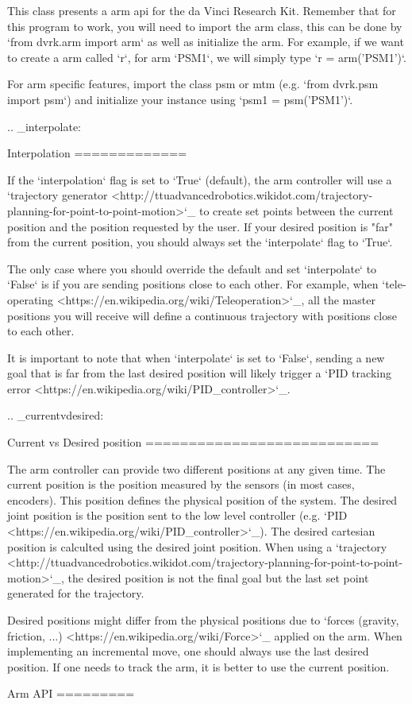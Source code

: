 \begin{DoxyVerb}This class presents a arm api for the da Vinci Research Kit.
Remember that for this program to work, you will need to import the
arm class, this can be done by `from dvrk.arm import arm` as well as
initialize the arm. For example, if we want to create a arm called
`r`, for arm `PSM1`, we will simply type `r = arm('PSM1')`.

For arm specific features, import the class psm or mtm (e.g. `from
dvrk.psm import psm`) and initialize your instance using `psm1 =
psm('PSM1')`.

.. _interpolate:

Interpolation
=============

If the `interpolation` flag is set to `True` (default), the arm
controller will use a `trajectory generator
<http://ttuadvancedrobotics.wikidot.com/trajectory-planning-for-point-to-point-motion>`_
to create set points between the current position and the position
requested by the user.  If your desired position is "far" from the
current position, you should always set the `interpolate` flag to
`True`.

The only case where you should override the default and set
`interpolate` to `False` is if you are sending positions close to each
other.  For example, when `tele-operating
<https://en.wikipedia.org/wiki/Teleoperation>`_, all the master
positions you will receive will define a continuous trajectory with
positions close to each other.

It is important to note that when `interpolate` is set to `False`,
sending a new goal that is far from the last desired position will
likely trigger a `PID tracking error <https://en.wikipedia.org/wiki/PID_controller>`_.

.. _currentvdesired:

Current vs Desired position
===========================

The arm controller can provide two different positions at any given
time.  The current position is the position measured by the sensors
(in most cases, encoders).  This position defines the physical
position of the system.  The desired joint position is the position
sent to the low level controller (e.g. `PID
<https://en.wikipedia.org/wiki/PID_controller>`_).  The desired
cartesian position is calculted using the desired joint position.
When using a `trajectory
<http://ttuadvancedrobotics.wikidot.com/trajectory-planning-for-point-to-point-motion>`_,
the desired position is not the final goal but the last set point
generated for the trajectory.

Desired positions might differ from the physical positions due to
`forces (gravity, friction, ...) <https://en.wikipedia.org/wiki/Force>`_ applied on the arm.  When
implementing an incremental move, one should always use the last
desired position.  If one needs to track the arm, it is better to
use the current position.

Arm API
=========\end{DoxyVerb}
 